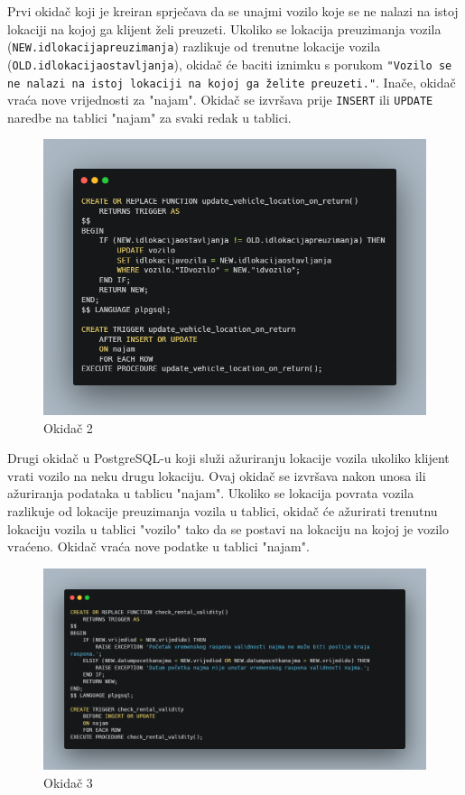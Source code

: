 \documentclass[]{foi}
\begin{document}
Prvi okidač koji je kreiran sprječava da se unajmi vozilo koje se ne nalazi na istoj lokaciji na kojoj ga klijent želi preuzeti. Ukoliko se lokacija preuzimanja vozila (\texttt{NEW.idlokacijapreuzimanja}) razlikuje od trenutne lokacije vozila  (\texttt{OLD.idlokacijaostavljanja}), okidač će baciti iznimku s porukom \texttt{"Vozilo se ne nalazi na istoj lokaciji na kojoj ga želite preuzeti."}. Inače, okidač vraća nove vrijednosti za "najam". Okidač se izvršava prije \texttt{INSERT} ili \texttt{UPDATE} naredbe na tablici "najam" za svaki redak u tablici.
\newpage

\begin{figure}[!ht]
    \centering
    \includegraphics[width=1\textwidth]{slike/2.png}
    \caption{Okidač 2}
    \label{fig:drugi}
\end{figure}

Drugi okidač u PostgreSQL-u koji služi ažuriranju lokacije vozila ukoliko klijent vrati vozilo na neku drugu lokaciju. Ovaj okidač se izvršava nakon unosa ili ažuriranja podataka u tablicu "najam". Ukoliko se lokacija povrata vozila razlikuje od lokacije preuzimanja vozila u tablici, okidač će ažurirati trenutnu lokaciju vozila u tablici "vozilo" tako da se postavi na lokaciju na kojoj je vozilo vraćeno. Okidač vraća nove podatke u tablici "najam".
\newpage

\begin{figure}[!ht]
    \centering
    \includegraphics[width=1\textwidth]{slike/3.png}
    \caption{Okidač 3}
    \label{fig:treci}
\end{figure}
\end{document}
